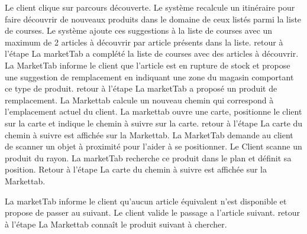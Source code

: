 \alternatifs
\startalternatif[UGM:SA1]
\etape Le client clique sur parcours découverte.
\etape Le système recalcule un itinéraire pour faire découvrir de nouveaux produits dans le domaine de ceux listés parmi la liste de courses. Le système ajoute ces suggestions à la liste de courses avec un maximum de 2 articles à découvrir par article présents dans la liste.
\etape retour à l'étape 
\stopcondition
\postcondition La marketTab a complété la liste de courses avec des articles à découvrir.
\stopalternatif
\startalternatif[UGM:SA1]
\etape La MarketTab informe le client que l'article est en rupture de stock et propose une suggestion de remplacement en indiquant une zone du magasin comportant ce type de produit.
\etape retour à l'étape 
\stopcondition
\postcondition La marketTab a proposé un produit de remplacement.
\stopalternatif
{}
\etape La Markettab calcule un nouveau chemin qui correspond à l'emplacement actuel du client. 
\etape La markettab ouvre une carte, positionne le client sur la carte et indique le chemin à suivre sur la carte.
\etape retour à l'étape 
\stopcondition
\postcondition La carte du chemin à suivre est affichée sur la Markettab.
\stopalternatif
\startalternatif[UGM:SA1]
\etape La MarketTab demande au client de scanner un objet à proximité pour l'aider à se positionner. 
\etape Le Client scanne un produit du rayon.
\etape La marketTab recherche ce produit dans le plan et définit sa position.
\etape Retour à l'étape \in[UGM:SA1]
\stopcondition
\postcondition La carte du chemin à suivre est affichée sur la Markettab.
\stopalternatif

\exception
\startalternatif[UGM:SA1]
  \etape La marketTab informe le client qu'aucun article équivalent n'est disponible et propose de passer au suivant.
  \etape Le client valide le passage a l'article suivant.
  \etape retour à l'étape 
\stopcondition
\postcondition La Markettab connaît le produit suivant à chercher.
\stopalternatif
\stopCU
